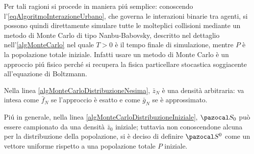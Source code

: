     Per tali ragioni si procede in maniera piú semplice: conoscendo l'\ref{eqAlgoritmoInterazioneUrbano}, che governa le interazioni binarie tra agenti, si possono quindi direttamente simulare tutte le molteplici collisioni mediante un metodo di Monte Carlo di tipo Nanbu-Babovsky, descritto nel dettaglio nell'\cref{algMonteCarlo} nel quale \(T>0\) è il tempo finale di simulazione, mentre \(P\) è la popolazione totale iniziale. Infatti usare un metodo di Monte Carlo è un approccio piú fisico perché si recupera la fisica particellare stocastica soggiacente all'equazione di Boltzmann.
    
    \begin{oss}
      Nella linea \ref{algMonteCarloDistribuzioneNesima}, \(\bar z_N\) è una densità arbitraria: va intesa come \(\bar f_N\) se l'approccio è esatto e come \(\bar g_N\) se è approssimato.
    \end{oss}

    \begin{oss}
      Piú in generale, nella linea \ref{algMonteCarloDistribuzioneIniziale}, \(\pazocal S_0\) può essere campionato da una densità \(\bar z_0\) iniziale; tuttavia non conoscendone alcuna per la distribuzione della popolazione, si è deciso di definire \(\pazocal S^0\) come un vettore uniforme rispetto a una popolazione totale \(P\) iniziale.
    \end{oss}

